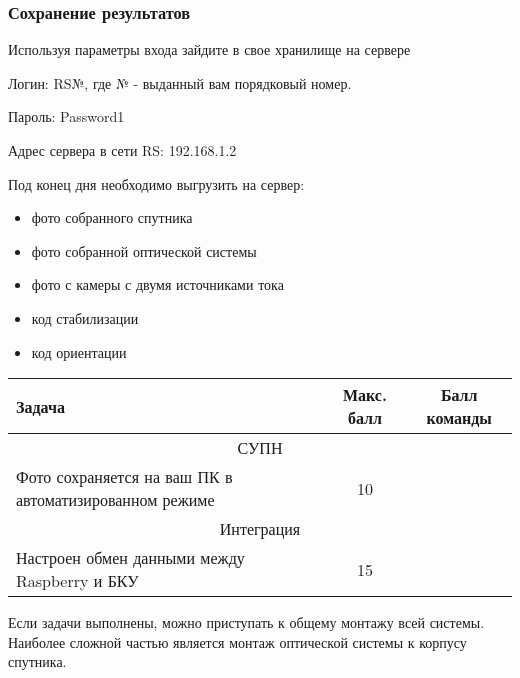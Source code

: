 \subsubsection*{Сохранение результатов}

Используя параметры входа зайдите в свое хранилище на сервере

Логин: RS№, где № - выданный вам порядковый номер.

Пароль: Password1

Адрес сервера в сети RS: 192.168.1.2

Под конец дня необходимо выгрузить на сервер:
\begin{itemize}
    \item фото собранного спутника
    \item фото собранной оптической системы
    \item фото с камеры с двумя источниками тока
    \item код стабилизации
    \item код ориентации
\end{itemize}

\markSection

\begin{table}[H]
    \center
    \begin{tabular}{|p{7cm}|c|c|}
        \hline
        Задача&	Макс. балл&	Балл команды\\
        \hline
        \multicolumn{3}{|c|}{СУПН} \\
        \hline
        Фото сохраняется на ваш ПК в автоматизированном режиме&10&\\
        \hline
        \multicolumn{3}{|c|}{Интеграция} \\
        \hline
        Настроен обмен данными между Raspberry и БКУ& 15&\\
        \hline
    \end{tabular}
\end{table}

Если задачи выполнены, можно приступать к общему монтажу всей системы. Наиболее сложной частью является монтаж оптической системы к корпусу спутника.